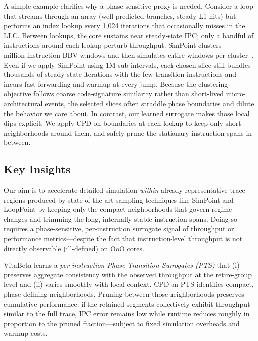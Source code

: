 A simple example clarifies why a phase‑sensitive proxy is needed. Consider a loop that streams through an array (well‑predicted branches, steady L1 hits) but performs an index lookup every 1,024 iterations that occasionally misses in the LLC. Between lookups, the core sustains near steady‑state IPC; only a handful of instructions around each lookup perturb throughput. SimPoint clusters million‑instruction BBV windows and then simulates entire windows per cluster~\cite{simpoint-asplos02,simpoint03,simpoint-howto}. Even if we apply SimPoint using 1M sub‑intervals, each chosen slice still bundles thousands of steady‑state iterations with the few transition instructions and incurs fast‑forwarding and warmup at every jump. Because the clustering objective follows coarse code‑signature similarity rather than short‑lived micro-architectural events, the selected slices often straddle phase boundaries and dilute the behavior we care about. In contrast, our learned surrogate makes those local dips explicit. We apply CPD on \pts boundaries at each lookup to keep only short neighborhoods around them, and safely prune the stationary instruction spans in between.

\subsection*{Key Insights}
\label{sec:intuition}
Our aim is to accelerate detailed simulation \emph{within} already representative trace regions produced by state of the art sampling techniques like SimPoint and LoopPoint by keeping only the compact neighborhoods that govern regime changes and trimming the long, internally stable instruction spans. Doing so requires a phase-sensitive, per-instruction surrogate signal of throughput or performance metrics—despite the fact that instruction-level throughput is not directly observable (ill-defined) on OoO cores.

VitaBeta learns a \emph{per-instruction Phase-Transition Surrogates (PTS)} that (i) preserves aggregate consistency with the observed throughput at the retire-group level and (ii) varies smoothly with local context. CPD on PTS identifies compact, phase-defining neighborhoods. Pruning between those neighborhoods preserves cumulative performance: if the retained segments collectively exhibit throughput similar to the full trace, IPC error remains low while runtime reduces roughly in proportion to the pruned fraction—subject to fixed simulation overheads and warmup costs.

